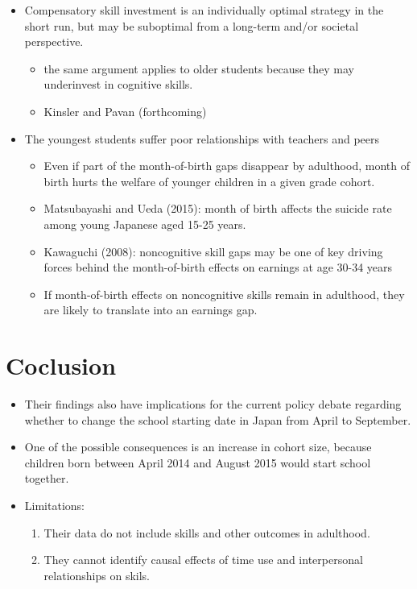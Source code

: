 \documentclass[../root]{subfiles}
\begin{document}
    \begin{itemize}
      \item Compensatory skill investment is an individually optimal strategy in the short run, but may be suboptimal from a long-term and/or societal perspective.
      \begin{itemize}
        \item the same argument applies to older students because they may underinvest in cognitive skills.
        \item Kinsler and Pavan (forthcoming)
      \end{itemize}
      \item The youngest students suffer poor relationships with teachers and peers
      \begin{itemize}
        \item Even if part of the month-of-birth gaps disappear by adulthood, month of birth hurts the welfare of younger children in a given grade cohort.
        \item Matsubayashi and Ueda (2015): month of birth affects the suicide rate among young Japanese aged 15-25 years.
        \item Kawaguchi (2008): noncognitive skill gaps may be one of key driving forces behind the month-of-birth effects on earnings at age 30-34 years
        \item If month-of-birth effects on noncognitive skills remain in adulthood, they are likely to translate into an earnings gap.
      \end{itemize}
    \end{itemize}

    \section{Coclusion}

    \begin{itemize}
      \item Their findings also have implications for the current policy debate regarding whether to change the school starting date in Japan from April to September.
      \item One of the possible consequences is an increase in cohort size, because children born between April 2014 and August 2015 would start school together.

      \item Limitations:
      \begin{enumerate}
        \item Their data do not include skills and other outcomes in adulthood.
        \item They cannot identify causal effects of time use and interpersonal relationships on skils.
      \end{enumerate}
    \end{itemize}



    \biblio
\end{document}
